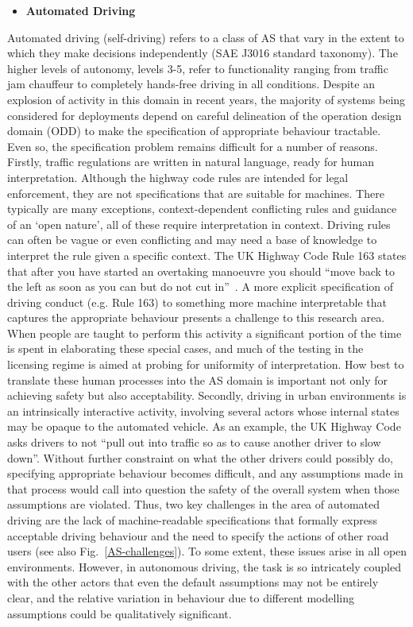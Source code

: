\documentclass[sigconf,nonacm]{acmart}%
\begin{document}
	\begin{itemize}[leftmargin=0.5cm]
		\item \textbf{Automated Driving} 
	\end{itemize}
	Automated driving (self-driving) refers to a class of AS that vary in the extent to which they make decisions independently (SAE J3016 standard taxonomy). The higher levels of autonomy, levels 3-5, refer to functionality ranging from traffic jam chauffeur to completely hands-free driving in all conditions. Despite an explosion of activity in this domain in recent years, the majority of systems being considered for deployments depend on careful delineation of the operation design domain (ODD) to make the specification of appropriate behaviour tractable. Even so, the specification problem remains difficult for a number of reasons. 
	Firstly, traffic regulations are written in natural language, ready for human interpretation. Although the highway code rules are intended for legal enforcement, they are not specifications that are suitable for machines. 
	There typically are many exceptions, context-dependent conflicting rules and guidance of an `open nature', all of these require interpretation in context. 
	Driving rules can often be vague or even conflicting and may need a base of knowledge to interpret the rule given a specific context. The UK Highway Code Rule 163 states that after you have started an overtaking manoeuvre you should ``move back to the left as soon as you can but do not cut in''~\cite{UKHighwayCode22}. A more explicit specification of driving conduct (e.g. Rule 163) to something more machine interpretable that captures the appropriate behaviour presents a challenge to this research area. When people are taught to perform this activity a significant portion of the time is spent in elaborating these special cases, and much of the testing in the licensing regime is aimed at probing for uniformity of interpretation. How best to translate these human processes into the AS domain is important not only for achieving safety but also acceptability.
	Secondly, driving in urban environments is an intrinsically interactive activity, involving several actors whose internal states may be opaque to the automated vehicle. As an example, the UK Highway Code asks drivers to not ``pull out into traffic so as to cause another driver to slow down''. 
	Without further constraint on what the other drivers could possibly do, specifying appropriate behaviour becomes difficult, and any assumptions made in that process would call into question the safety of the overall system when those assumptions are violated. 
	Thus, two key challenges in the area of automated driving are the lack of machine-readable specifications that formally express acceptable driving behaviour and the need to specify the actions of other road users (see also Fig.~\ref{AS-challenges}). To some extent, these issues arise in all open environments. However, in autonomous driving, the task is so intricately coupled with the other actors that even the default assumptions may not be entirely clear, and the relative variation in behaviour due to different modelling assumptions could be qualitatively significant.
	
\end{document}
